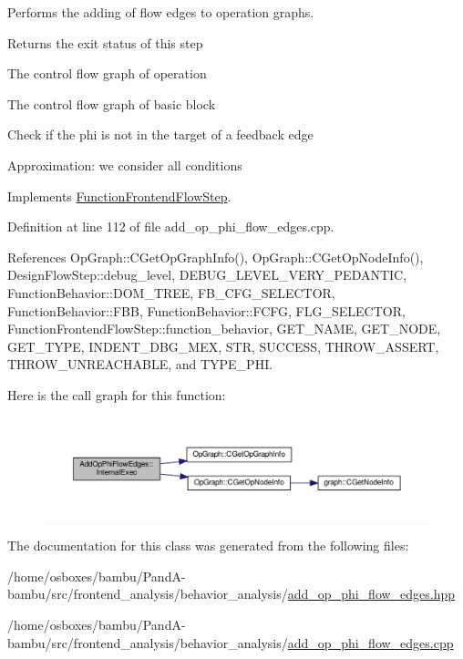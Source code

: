 Performs the adding of flow edges to operation graphs. 

\begin{DoxyReturn}{Returns}
the exit status of this step 
\end{DoxyReturn}
The control flow graph of operation

The control flow graph of basic block

Check if the phi is not in the target of a feedback edge

Approximation\+: we consider all conditions 

Implements \hyperlink{classFunctionFrontendFlowStep_a00612f7fb9eabbbc8ee7e39d34e5ac68}{Function\+Frontend\+Flow\+Step}.



Definition at line 112 of file add\+\_\+op\+\_\+phi\+\_\+flow\+\_\+edges.\+cpp.



References Op\+Graph\+::\+C\+Get\+Op\+Graph\+Info(), Op\+Graph\+::\+C\+Get\+Op\+Node\+Info(), Design\+Flow\+Step\+::debug\+\_\+level, D\+E\+B\+U\+G\+\_\+\+L\+E\+V\+E\+L\+\_\+\+V\+E\+R\+Y\+\_\+\+P\+E\+D\+A\+N\+T\+IC, Function\+Behavior\+::\+D\+O\+M\+\_\+\+T\+R\+EE, F\+B\+\_\+\+C\+F\+G\+\_\+\+S\+E\+L\+E\+C\+T\+OR, Function\+Behavior\+::\+F\+BB, Function\+Behavior\+::\+F\+C\+FG, F\+L\+G\+\_\+\+S\+E\+L\+E\+C\+T\+OR, Function\+Frontend\+Flow\+Step\+::function\+\_\+behavior, G\+E\+T\+\_\+\+N\+A\+ME, G\+E\+T\+\_\+\+N\+O\+DE, G\+E\+T\+\_\+\+T\+Y\+PE, I\+N\+D\+E\+N\+T\+\_\+\+D\+B\+G\+\_\+\+M\+EX, S\+TR, S\+U\+C\+C\+E\+SS, T\+H\+R\+O\+W\+\_\+\+A\+S\+S\+E\+RT, T\+H\+R\+O\+W\+\_\+\+U\+N\+R\+E\+A\+C\+H\+A\+B\+LE, and T\+Y\+P\+E\+\_\+\+P\+HI.

Here is the call graph for this function\+:
\nopagebreak
\begin{figure}[H]
\begin{center}
\leavevmode
\includegraphics[width=350pt]{dd/dfd/classAddOpPhiFlowEdges_a9048d91ea14da87e31587780a5261c34_cgraph}
\end{center}
\end{figure}


The documentation for this class was generated from the following files\+:\begin{DoxyCompactItemize}
\item 
/home/osboxes/bambu/\+Pand\+A-\/bambu/src/frontend\+\_\+analysis/behavior\+\_\+analysis/\hyperlink{add__op__phi__flow__edges_8hpp}{add\+\_\+op\+\_\+phi\+\_\+flow\+\_\+edges.\+hpp}\item 
/home/osboxes/bambu/\+Pand\+A-\/bambu/src/frontend\+\_\+analysis/behavior\+\_\+analysis/\hyperlink{add__op__phi__flow__edges_8cpp}{add\+\_\+op\+\_\+phi\+\_\+flow\+\_\+edges.\+cpp}\end{DoxyCompactItemize}
